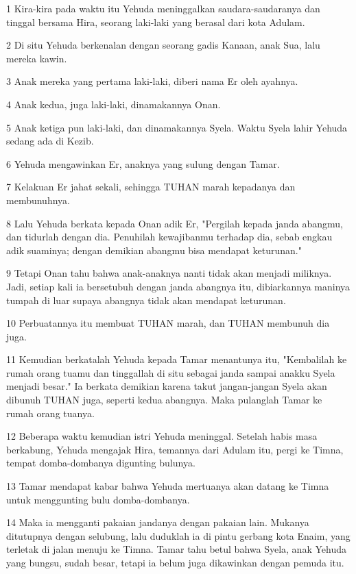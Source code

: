 \par 1 Kira-kira pada waktu itu Yehuda meninggalkan saudara-saudaranya dan tinggal bersama Hira, seorang laki-laki yang berasal dari kota Adulam.
\par 2 Di situ Yehuda berkenalan dengan seorang gadis Kanaan, anak Sua, lalu mereka kawin.
\par 3 Anak mereka yang pertama laki-laki, diberi nama Er oleh ayahnya.
\par 4 Anak kedua, juga laki-laki, dinamakannya Onan.
\par 5 Anak ketiga pun laki-laki, dan dinamakannya Syela. Waktu Syela lahir Yehuda sedang ada di Kezib.
\par 6 Yehuda mengawinkan Er, anaknya yang sulung dengan Tamar.
\par 7 Kelakuan Er jahat sekali, sehingga TUHAN marah kepadanya dan membunuhnya.
\par 8 Lalu Yehuda berkata kepada Onan adik Er, "Pergilah kepada janda abangmu, dan tidurlah dengan dia. Penuhilah kewajibanmu terhadap dia, sebab engkau adik suaminya; dengan demikian abangmu bisa mendapat keturunan."
\par 9 Tetapi Onan tahu bahwa anak-anaknya nanti tidak akan menjadi miliknya. Jadi, setiap kali ia bersetubuh dengan janda abangnya itu, dibiarkannya maninya tumpah di luar supaya abangnya tidak akan mendapat keturunan.
\par 10 Perbuatannya itu membuat TUHAN marah, dan TUHAN membunuh dia juga.
\par 11 Kemudian berkatalah Yehuda kepada Tamar menantunya itu, "Kembalilah ke rumah orang tuamu dan tinggallah di situ sebagai janda sampai anakku Syela menjadi besar." Ia berkata demikian karena takut jangan-jangan Syela akan dibunuh TUHAN juga, seperti kedua abangnya. Maka pulanglah Tamar ke rumah orang tuanya.
\par 12 Beberapa waktu kemudian istri Yehuda meninggal. Setelah habis masa berkabung, Yehuda mengajak Hira, temannya dari Adulam itu, pergi ke Timna, tempat domba-dombanya digunting bulunya.
\par 13 Tamar mendapat kabar bahwa Yehuda mertuanya akan datang ke Timna untuk menggunting bulu domba-dombanya.
\par 14 Maka ia mengganti pakaian jandanya dengan pakaian lain. Mukanya ditutupnya dengan selubung, lalu duduklah ia di pintu gerbang kota Enaim, yang terletak di jalan menuju ke Timna. Tamar tahu betul bahwa Syela, anak Yehuda yang bungsu, sudah besar, tetapi ia belum juga dikawinkan dengan pemuda itu.
